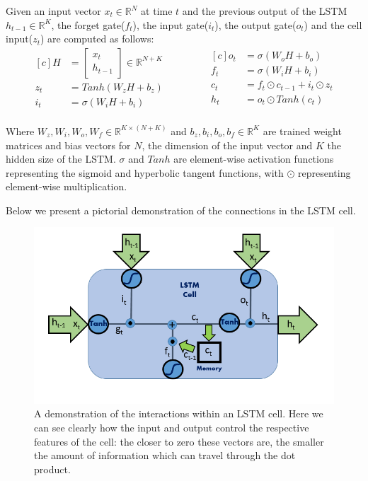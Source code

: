 \documentclass{article} %
\begin{document}
Given an input vector $x_{t} \in \mathbb{R}^{N}$ at time $t$ and the previous output of the LSTM $h_{t-1} \in \mathbb{R}^{K}$, the forget gate($f_{t}$), the input gate($i_{t}$), the output gate($o_{t}$) and the cell input($z_{t}$) are computed as follows:
\begin{equation}
\begin{aligned}[c]
    H &= \left[ \begin{array}{cc}
         x_{t}  \\
         h_{t-1} 
    \end{array} \right] \in \mathbb{R}^{N+K} \\
    z_{t} &= Tanh(W_{z}H + b_{z}) \\
    i_{t} &= \sigma(W_{i}H + b_{i})\\
    \end{aligned}
    \qquad \qquad
    \begin{aligned}[c]
    o_{t} &= \sigma(W_{o}H + b_{o})\\
    f_{t} &= \sigma(W_{i}H + b_{i})\\
    c_{t} &= f_{t} \odot c_{t-1} + i_{t} \odot z_{t} \\
    h_{t} &= o_{t} \odot Tanh(c_{t}) \\
    \end{aligned}
\end{equation}

Where $W_{z}, W_{i}, W_{o}, W_{f} \in \mathbb{R}^{K \times(N+K)}$ and $b_{z}, b_{i}, b_{o}, b_{f} \in \mathbb{R}^{K}$ are trained weight matrices and bias vectors for $N$, the dimension of the input vector and $K$ the hidden size of the LSTM. $\sigma$ and $Tanh$ are element-wise activation functions representing the sigmoid and hyperbolic tangent functions, with $\odot$ representing element-wise multiplication. 

Below we present a pictorial demonstration of the connections in the LSTM cell. 

\begin{figure}[H]
\begin{center}
\includegraphics[width=0.8 \linewidth]{LSTM.png} 
\end{center}
\caption{A demonstration of the interactions within an LSTM cell. Here we can see clearly how the input and output control the respective features of the cell: the closer to zero these vectors are, the smaller the amount of information which can travel through the dot product.}
\end{figure}
\end{document}
